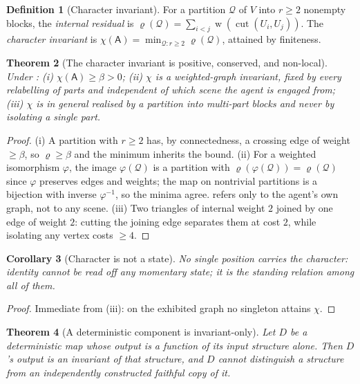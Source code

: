 \documentclass[11pt,a4paper]{article}
\theoremstyle{clstyle}
\newtheorem{theorem}{Theorem}[section]
\newtheorem{corollary}[theorem]{Corollary}
\theoremstyle{definition}
\newtheorem{definition}[theorem]{Definition}
\theoremstyle{remark}
\DeclareMathOperator{\wt}{w}
\DeclareMathOperator{\cut}{cut}
\newcommand{\V}{V}
\newcommand{\flo}{\beta}
\newcommand{\Ag}{\mathsf{A}}
\newcommand{\Char}{\chi}
\begin{document}
\begin{definition}[Character invariant]
\label{def:char}
For a partition $\mathcal{Q}$ of $\V$ into $r\ge2$ nonempty blocks, the
\emph{internal residual} is
$\varrho(\mathcal{Q})=\sum_{i<j}\wt(\cut(U_i,U_j))$. The \emph{character
invariant} is $\Char(\Ag)=\min_{\mathcal{Q}:r\ge2}\varrho(\mathcal{Q})$,
attained by finiteness.
\end{definition}

\begin{theorem}[The character invariant is positive, conserved, and non-local]
\label{thm:char}
Under :
\textup{(i)} $\Char(\Ag)\ge\flo>0$;
\textup{(ii)} $\Char$ is a weighted-graph invariant, fixed by every
relabelling of parts and independent of which scene the agent is engaged
from;
\textup{(iii)} $\Char$ is in general realised by a partition into multi-part
blocks and never by isolating a single part.
\end{theorem}

\begin{proof}
(i) A partition with $r\ge2$ has, by connectedness, a crossing edge of weight
$\ge\flo$, so $\varrho\ge\flo$ and the minimum inherits the bound.
(ii) For a weighted isomorphism $\varphi$, the image $\varphi(\mathcal{Q})$
is a partition with $\varrho(\varphi(\mathcal{Q}))=\varrho(\mathcal{Q})$
since $\varphi$ preserves edges and weights; the map on nontrivial partitions
is a bijection with inverse $\varphi^{-1}$, so the minima agree.
 refers only to the agent's own graph, not to any scene.
(iii) Two triangles of internal weight $2$ joined by one edge of weight $2$:
cutting the joining edge separates them at cost $2$, while isolating any
vertex costs $\ge4$.
\end{proof}

\begin{corollary}[Character is not a state]
\label{cor:not-state}
No single position carries the character: identity cannot be read off any
momentary state; it is the standing relation among all of them.
\end{corollary}

\begin{proof}
Immediate from (iii): on the exhibited graph no singleton
attains $\Char$.
\end{proof}

\begin{theorem}[A deterministic component is invariant-only]
\label{thm:det-blind}
Let $D$ be a deterministic map whose output is a function of its input
structure alone. Then $D$'s output is an invariant of that structure, and
$D$ cannot distinguish a structure from an independently constructed
faithful copy of it.
\end{theorem}
\end{document}
